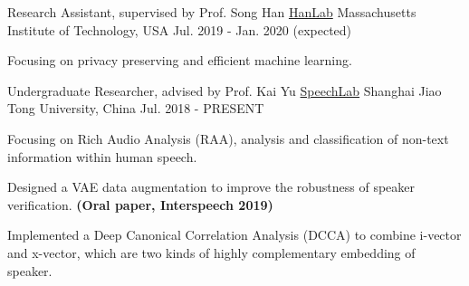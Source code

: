 \begin{cventries}
    \cventry
    {Research Assistant, supervised by Prof. Song Han}
    {\href{songhan.mit.edu}{HanLab}}
    {Massachusetts Institute of Technology, USA}
    {Jul. 2019 - Jan. 2020 (expected)}
    {
        \begin{cvitems}
            \item {Focusing on privacy preserving and efficient machine learning.}
        \end{cvitems}
    }
    
	\cventry
	{Undergraduate Researcher, advised by Prof. Kai Yu}
	{\href{https://speechlab.sjtu.edu.cn/}{SpeechLab}}
	{Shanghai Jiao Tong University, China}
	{Jul. 2018 - PRESENT}
	{
		\begin{cvitems}
			\item {Focusing on Rich Audio Analysis (RAA), analysis and classification of non-text information within human speech.}
            \item {Designed a VAE data augmentation to improve the robustness of speaker verification. \textbf{(Oral paper, Interspeech 2019)}}
            \item {Implemented a Deep Canonical Correlation Analysis (DCCA) to combine i-vector and x-vector, which are two kinds of highly complementary embedding of speaker.}
		\end{cvitems}
	}
	
\end{cventries}
